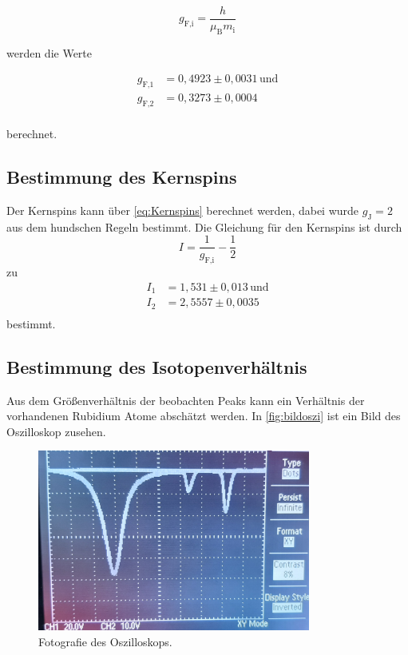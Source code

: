 \begin{equation*}
    g_{\text{F,i}} = \dfrac{h}{\mu_\text{B} m_\text{i}}
\end{equation*}

werden die Werte

\begin{align*}
    g_{\text{F,1}} &= 0,4923 \pm 0,0031 \, \text{und} \\
    g_{\text{F,2}} &= 0,3273 \pm 0,0004           \\
\end{align*}

berechnet.

\subsection{Bestimmung des Kernspins}

Der Kernspins kann über \eqref{eq:Kernspins} berechnet werden, dabei wurde $g_\text{J} = 2$ aus dem hundschen Regeln bestimmt.
Die Gleichung für den Kernspins ist durch 
\begin{equation*}
    I = \dfrac{1}{g_{\text{F,i}}} - \dfrac{1}{2}
\end{equation*}
zu 
\begin{align*}
    I_1 &= 1,531  \pm 0,013 \, \text{und} \\
    I_2 &= 2,5557 \pm 0,0035           \\
\end{align*}
bestimmt.

\subsection{Bestimmung des Isotopenverhältnis}

Aus dem Größenverhältnis der beobachten Peaks kann ein Verhältnis der vorhandenen Rubidium Atome abschätzt werden.  
In \autoref{fig:bildoszi} ist ein Bild des Oszilloskop zusehen.

\begin{figure}[H]
    \centering
    \includegraphics[width=0.8\textwidth]{Messdaten/v21_oszi.pdf}
    \caption{Fotografie des Oszilloskops.}
    \label{fig:bildoszi}
\end{figure}

